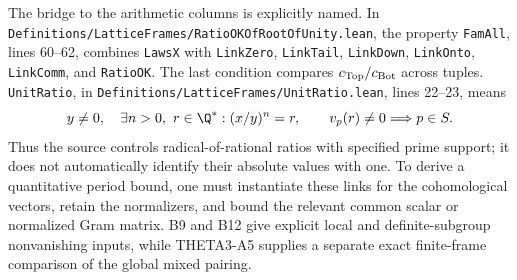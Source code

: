 The bridge to the arithmetic columns is explicitly named. In
\texttt{Definitions/LatticeFrames/RatioOKOfRootOfUnity.lean}, the property
\texttt{FamAll}, lines 60--62, combines \texttt{LawsX} with
\texttt{LinkZero}, \texttt{LinkTail}, \texttt{LinkDown},
\texttt{LinkOnto}, \texttt{LinkComm}, and \texttt{RatioOK}.
The last condition compares $c_{\rm Top}/c_{\rm Bot}$ across tuples.
\texttt{UnitRatio}, in \texttt{Definitions/LatticeFrames/UnitRatio.lean}, lines 22--23, means
\[
 y\ne0,\quad \exists n>0,\ r\in\Q^*:
 (x/y)^n=r,
 \qquad v_p(r)\ne0\Longrightarrow p\in S.
\]
Thus the source controls radical-of-rational ratios with specified prime support; it does not automatically identify their absolute values with one. To derive a quantitative period bound, one must instantiate these links for the cohomological vectors, retain the normalizers, and bound the relevant common scalar or normalized Gram matrix. B9 and B12 give explicit local and definite-subgroup nonvanishing inputs, while THETA3-A5 supplies a separate exact finite-frame comparison of the global mixed pairing.
